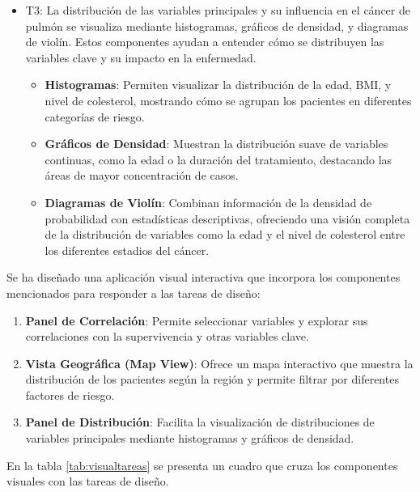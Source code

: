 \documentclass[10pt,journal,compsoc]{IEEEtran}
\begin{document}
\begin{itemize}
\item T3:
La distribución de las variables principales y su influencia en el cáncer de pulmón se visualiza mediante histogramas, gráficos de densidad, y diagramas de violín. Estos componentes ayudan a entender cómo se distribuyen las variables clave y su impacto en la enfermedad.

\begin{itemize}
    \item \textbf{Histogramas}: Permiten visualizar la distribución de la edad, BMI, y nivel de colesterol, mostrando cómo se agrupan los pacientes en diferentes categorías de riesgo.
    \item \textbf{Gráficos de Densidad}: Muestran la distribución suave de variables continuas, como la edad o la duración del tratamiento, destacando las áreas de mayor concentración de casos.
    \item \textbf{Diagramas de Violín}: Combinan información de la densidad de probabilidad con estadísticas descriptivas, ofreciendo una visión completa de la distribución de variables como la edad y el nivel de colesterol entre los diferentes estadios del cáncer.
\end{itemize}

\end{itemize}

Se ha diseñado una aplicación visual interactiva que incorpora los componentes mencionados para responder a las tareas de diseño:

\begin{enumerate}
    \item \textbf{Panel de Correlación}: Permite seleccionar variables y explorar sus correlaciones con la supervivencia y otras variables clave.
    \item \textbf{Vista Geográfica (Map View)}: Ofrece un mapa interactivo que muestra la distribución de los pacientes según la región y permite filtrar por diferentes factores de riesgo.
    \item \textbf{Panel de Distribución}: Facilita la visualización de distribuciones de variables principales mediante histogramas y gráficos de densidad.
\end{enumerate}

En la tabla \ref{tab:visualtareas} se presenta un cuadro que cruza los componentes visuales con las tareas de diseño.
\end{document}
